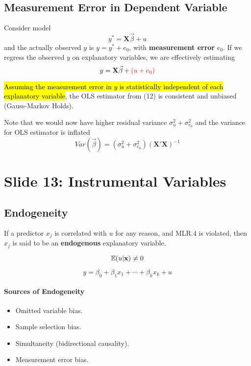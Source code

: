 \documentclass[]{article}
\begin{document}
		\subsection{Measurement Error in Dependent Variable}
			\par Consider model 
			\begin{equation}
				y^{*} = \textbf{X}\vec{\beta} + u
			\end{equation}
			and the actually observed $y$ is $y = y^{*} + e_0$, with \textbf{measurement error} $e_0$. If we regress the observed $y$ on explanatory variables, we are effectively estimating
			\begin{equation}
				y = \textbf{X}\vec{\beta} + \textcolor{red}{(u+e_0)}
			\end{equation}
			\begin{remark}
				\hl{Assuming the measurement error in $y$ is statistically independent of each explanatory variable}, the OLS estimator from (12) is consistent and unbiased (Gauss-Markov Holds).
			\end{remark}
			\begin{remark}
			Note that we would now have higher residual variance $\sigma_u^2 + \sigma_{e_0}^2$ and the variance for OLS estimator is inflated
				\[
					Var(\vec{\beta}) = (\sigma_u^2 + \sigma_{e_0}^2) (\textbf{X}'\textbf{X})^{-1}
				\]
			\end{remark}
			
			
			
	\section{Slide 13: Instrumental Variables}
		\subsection{Endogeneity}
			\begin{definition}
				If a predictor $x_j$ is correlated with $u$ for any reason, and MLR.4 is violated, then $x_j$ is said to be an \textbf{endogenous} explanatory variable.
			\end{definition}
			\[
				\mathbb{E}({u|\textbf{x}}) \neq 0
			\]
			
			\begin{equation}
				y = \beta_0 + \beta_1 x_1 + \cdots + \beta_k x_k + u
			\end{equation}
			
			\paragraph{Sources of Endogeneity}
				\begin{itemize}
					\item Omitted variable bias.
					\item Sample selection bias.
					\item Simultaneity (bidirectional causality).
					\item Measurement error bias.
				\end{itemize}
\end{document}
